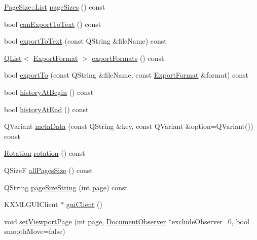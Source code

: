 \begin{DoxyCompactItemize}
\hyperlink{classOkular_1_1PageSize_a6c450ee7c579f47402a21588403ea0ab}{Page\+Size\+::\+List} \hyperlink{classOkular_1_1Document_ab27493b7a9aafe7e9bf7fe2d8e291703}{page\+Sizes} () const 
\item 
bool \hyperlink{classOkular_1_1Document_a004a5cf38402e7ee4a057311ef507e10}{can\+Export\+To\+Text} () const 
\item 
bool \hyperlink{classOkular_1_1Document_a7f78a55a2c779daa2cb77af7c11b1c37}{export\+To\+Text} (const Q\+String \&file\+Name) const 
\item 
\hyperlink{classQList}{Q\+List}$<$ \hyperlink{classOkular_1_1ExportFormat}{Export\+Format} $>$ \hyperlink{classOkular_1_1Document_acd6e2014d6198fa7411ae02a138eccb7}{export\+Formats} () const 
\item 
bool \hyperlink{classOkular_1_1Document_a1f77c325fb8d44dcac9e8bbdda442653}{export\+To} (const Q\+String \&file\+Name, const \hyperlink{classOkular_1_1ExportFormat}{Export\+Format} \&format) const 
\item 
bool \hyperlink{classOkular_1_1Document_a571e0df4ac4b081e4c81698d589163b0}{history\+At\+Begin} () const 
\item 
bool \hyperlink{classOkular_1_1Document_a7360baadbd779d106c38d12a3e0c911e}{history\+At\+End} () const 
\item 
Q\+Variant \hyperlink{classOkular_1_1Document_a44c7c367dbe37fffeeb3d08171ff9ab6}{meta\+Data} (const Q\+String \&key, const Q\+Variant \&option=Q\+Variant()) const 
\item 
\hyperlink{namespaceOkular_a8556d00465f61ef533c6b027669e7da6}{Rotation} \hyperlink{classOkular_1_1Document_aa419f95f101b5672926c7cd4485f12e6}{rotation} () const 
\item 
Q\+Size\+F \hyperlink{classOkular_1_1Document_a9a1f670222f9e036d11e11ac6876c086}{all\+Pages\+Size} () const 
\item 
Q\+String \hyperlink{classOkular_1_1Document_a4dab280eb08b17c40feefe6bd2e46886}{page\+Size\+String} (int \hyperlink{classOkular_1_1Document_a1c95c2f192d739c217d00971da48f69d}{page}) const 
\item 
K\+X\+M\+L\+G\+U\+I\+Client $\ast$ \hyperlink{classOkular_1_1Document_a414f0d44e1bb2b44fd31e68c0bc79dfe}{gui\+Client} ()
\item 
void \hyperlink{classOkular_1_1Document_ac3bdbd5137c7fd4d5e960646affc25ec}{set\+Viewport\+Page} (int \hyperlink{classOkular_1_1Document_a1c95c2f192d739c217d00971da48f69d}{page}, \hyperlink{classOkular_1_1DocumentObserver}{Document\+Observer} $\ast$exclude\+Observer=0, bool smooth\+Move=false)

\end{DoxyCompactItemize}
